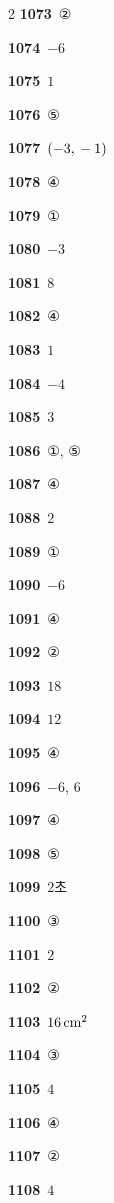 \documentclass[10pt,a4paper]{article}
\begin{document}
\begin{multicols}{2}
\noindent\textbf{1073}\ ②\par
\noindent\textbf{1074}\ $-6$\par
\noindent\textbf{1075}\ $1$\par
\noindent\textbf{1076}\ ⑤\par
\noindent\textbf{1077}\ $(-3{,}\mkern3mu -1)$\par
\noindent\textbf{1078}\ ④\par
\noindent\textbf{1079}\ ①\par
\noindent\textbf{1080}\ $-3$\par
\noindent\textbf{1081}\ $8$\par
\noindent\textbf{1082}\ ④\par
\noindent\textbf{1083}\ $1$\par
\noindent\textbf{1084}\ $-4$\par
\noindent\textbf{1085}\ $3$\par
\noindent\textbf{1086}\ ①, ⑤\par
\noindent\textbf{1087}\ ④\par
\noindent\textbf{1088}\ $2$\par
\noindent\textbf{1089}\ ①\par
\noindent\textbf{1090}\ $-6$\par
\noindent\textbf{1091}\ ④\par
\noindent\textbf{1092}\ ②\par
\noindent\textbf{1093}\ $18$\par
\noindent\textbf{1094}\ $12$\par
\noindent\textbf{1095}\ ④\par
\noindent\textbf{1096}\ $-6$, $6$\par
\noindent\textbf{1097}\ ④\par
\noindent\textbf{1098}\ ⑤\par
\noindent\textbf{1099}\ $2$초\par
\noindent\textbf{1100}\ ③\par
\noindent\textbf{1101}\ $2$\par
\noindent\textbf{1102}\ ②\par
\noindent\textbf{1103}\ $16\mkern3mu \mathrm{cm}^2$\par
\noindent\textbf{1104}\ ③\par
\noindent\textbf{1105}\ $4$\par
\noindent\textbf{1106}\ ④\par
\noindent\textbf{1107}\ ②\par
\noindent\textbf{1108}\ $4$\par

\end{multicols}
\end{document}
